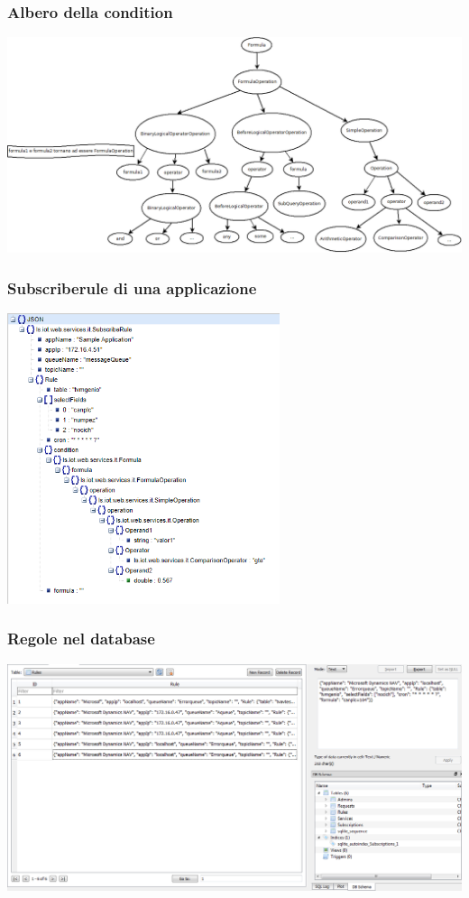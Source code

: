 \documentclass{beamer}
\begin{document}
\begin{frame}
\frametitle{Albero della condition}
\includegraphics[width=1\textwidth]{images/struttura-query-tree.png}
\end{frame}

\begin{frame}
\frametitle{Subscriberule di una applicazione}
\includegraphics[width=0.6\textwidth]{images/subscribe-json-1.png}
\end{frame}

\begin{frame}
\frametitle{Regole nel database}
\includegraphics[width=1\textwidth]{images/DBPlatform1.png}
\end{frame}
\end{document}
